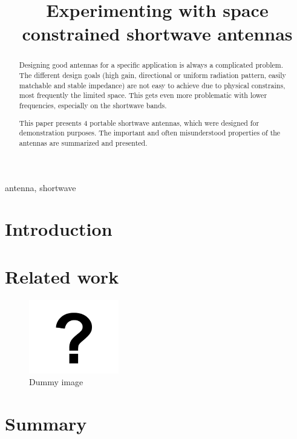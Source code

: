 \documentclass[conference]{IEEEtran}
\begin{document}
\title{Experimenting with space constrained shortwave antennas}

\author{
}

\maketitle

\begin{abstract}
  Designing good antennas for a specific application is always
  a complicated problem. The different design goals (high gain,
  directional or uniform radiation pattern, easily matchable
  and stable impedance) are not easy to achieve due to
  physical constrains, most frequently the limited space.
  This gets even more problematic with lower frequencies,
  especially on the shortwave bands.

  This paper presents 4 portable shortwave antennas, which
  were designed for demonstration purposes. The important
  and often misunderstood properties of the antennas
  are summarized and presented.
\end{abstract}

\begin{IEEEkeywords}
antenna, shortwave
\end{IEEEkeywords}

\section{Introduction}


\section{Related work}

\begin{figure}[htbp]
	\centering
	\includegraphics[width=0.35\textwidth]{fig/dummy.png}
	\caption{Dummy image}
	\label{fig-dummy}
\end{figure}

\section{Summary}




\end{document}
